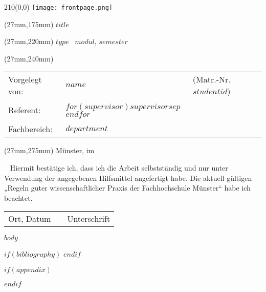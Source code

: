 \documentclass[10 pt,bibliography=totoc]{scrreprt}
\begin{document}
\begin{titlepage}
\begin{textblock}{210}(0,0)
	\texttt{[image: frontpage.png]}
\end{textblock}
\doublespacing
\begin{textblock*}{156mm}(27mm,175mm)
	\LARGE \textbf{$title$}
\end{textblock*}
\singlespacing
\begin{textblock*}{156mm}(27mm,220mm)
	\Large $type$ \ \textbf{$modul$}, $semester$
\end{textblock*}
\begin{textblock*}{156mm}(27mm,240mm)
	\normalsize
	\begin{tabularx}{120mm}{l X l}
		Vorgelegt von:&\textbf{$name$}&(Matr.-Nr. $studentid$)\\
		&&\\
		Referent:&\textbf{$for(supervisor)$$supervisor$$sep$ \newline $endfor$}\\
		&&\\
		Fachbereich:&\textbf{$department$}\\
	\end{tabularx}
\end{textblock*}
\begin{textblock*}{156mm}(27mm,275mm)
	Münster, im \makeatletter \month@ngerman \makeatother \ \the\year
\end{textblock*}
\end{titlepage}
\clearpage
\newpage
\mbox{~}
\clearpage
\newpage
\thispagestyle{empty}
\vspace*{10mm}
\normalsize
\doublespacing
Hiermit bestätige ich, dass ich die Arbeit selbstständig und nur unter Verwendung der angegebenen Hilfsmittel angefertigt habe. Die aktuell gültigen „Regeln guter wissenschaftlicher Praxis der Fachhochschule Münster“ habe ich beachtet.
\vspace{20mm}
\hspace{-1cm}
\begin{table}[h]
	\centering
	\begin{tabular}{p{50mm}p{50mm}p{50mm}}
		Ort, Datum& &Unterschrift
	\end{tabular}
\end{table}
\newpage

\tableofcontents
\listoffigures
\listoftables

$body$

$if(bibliography)$
%
%
\printbibliography[]
$endif$

$if(appendix)$

$endif$
\end{document}
